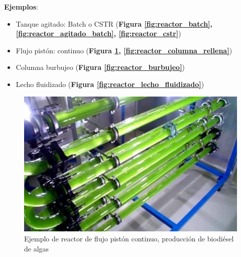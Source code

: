 \textbf{Ejemplos}:
    
\begin{multicols}{2}
    \begin{itemize}
        \item Tanque agitado: Batch o CSTR (\textbf{Figura \ref{fig:reactor_batch}, \ref{fig:reactor_agitado_batch}, \ref{fig:reactor_cstr}})
        \item Flujo pistón: continuo (\textbf{Figura \ref{fig:reactor_flujo_piston}, \ref{fig:reactor_columna_rellena}})
        \item Columna burbujeo (\textbf{Figura \ref{fig:reactor_burbujeo}})
        \item Lecho fluidizado (\textbf{Figura \ref{fig:reactor_lecho_fluidizado}})
    \end{itemize}
    
    \begin{figure}
        \centering
        \includegraphics[width=\textwidth]{img/fotos/biorreactor_flujo_piston.png}
        \caption{Ejemplo de reactor de flujo pistón continuo, producción de biodiésel de algas}
        \label{fig:reactor_flujo_piston}
    \end{figure}
    

\end{multicols}
